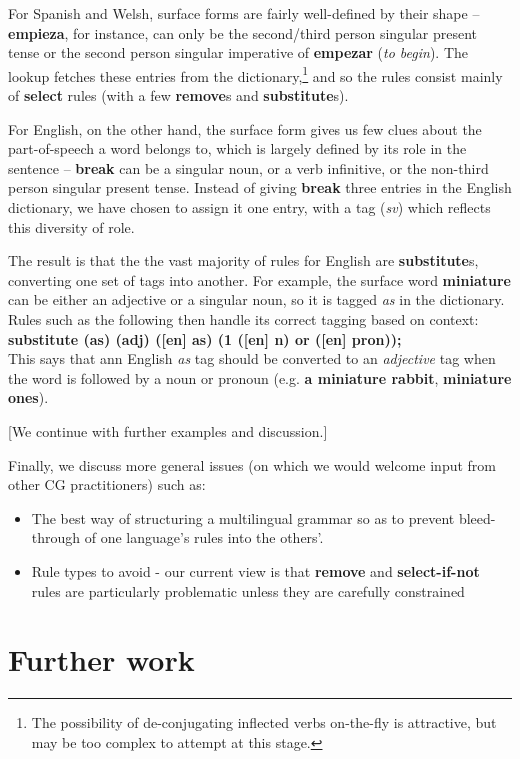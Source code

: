 \documentclass[11pt]{article}
\begin{document}
For Spanish and Welsh, surface forms are fairly well-defined by their shape -- \textbf{empieza}, for instance, can only be the second/third person singular present tense or the second person singular imperative of \textbf{empezar} (\textit{to begin}).  The lookup fetches these entries from the dictionary,\footnote{The possibility of de-conjugating inflected verbs on-the-fly is attractive, but may be too complex to attempt at this stage.} and so the rules consist mainly of \textbf{select} rules (with a few \textbf{remove}s and \textbf{substitute}s).  

For English, on the other hand, the surface form gives us few clues about the part-of-speech a word belongs to, which is largely defined by its role in the sentence -- \textbf{break} can be a singular noun, or a verb infinitive, or the non-third person singular present tense.  Instead of giving \textbf{break} three entries in the English dictionary, we have chosen to assign it one entry, with a tag (\textit{sv}) which reflects this diversity of role.  

The result is that the the vast majority of rules for English are \textbf{substitute}s, converting one set of tags into another.  For example, the surface word \textbf{miniature} can be either an adjective or a singular noun, so it is tagged \textit{as} in the dictionary.  Rules such as the following then handle its correct tagging based on context:\\
\indent\textbf{substitute (as) (adj) ([en] as) (1 ([en] n) or ([en] pron));}\\
This says that ann English \textit{as} tag should be converted to an \textit{adjective} tag when the word is followed by a noun or pronoun (e.g. \textbf{a miniature rabbit}, \textbf{miniature ones}).

[We continue with further examples and discussion.]

Finally, we discuss more general issues (on which we would welcome input from other CG practitioners) such as:
\begin{itemize}
\item The best way of structuring a multilingual grammar so as to prevent bleed-through of one language's rules into the others'.
\item Rule types to avoid - our current view is that \textbf{remove} and \textbf{select-if-not} rules are particularly problematic unless they are carefully constrained
\end{itemize}

\section{Further work}
\label{sec:further}
\end{document}
